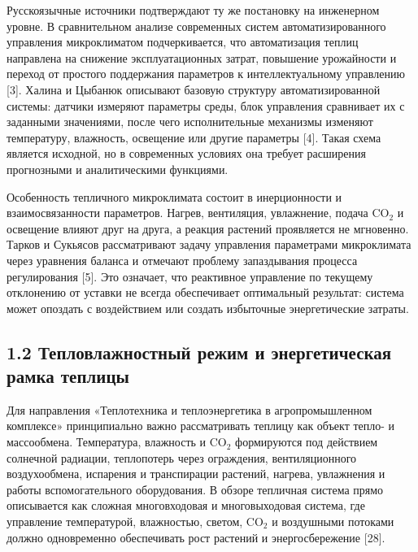 \documentclass[a4paper,14pt]{extarticle}
\begin{document}
Русскоязычные источники подтверждают ту же постановку на инженерном
уровне. В сравнительном анализе современных систем автоматизированного
управления микроклиматом подчеркивается, что автоматизация теплиц
направлена на снижение эксплуатационных затрат, повышение урожайности и
переход от простого поддержания параметров к интеллектуальному
управлению {[}3{]}. Халина и Цыбанюк описывают базовую структуру
автоматизированной системы: датчики измеряют параметры среды, блок
управления сравнивает их с заданными значениями, после чего
исполнительные механизмы изменяют температуру, влажность, освещение или
другие параметры {[}4{]}. Такая схема является исходной, но в
современных условиях она требует расширения прогнозными и аналитическими
функциями.

Особенность тепличного микроклимата состоит в инерционности и
взаимосвязанности параметров. Нагрев, вентиляция, увлажнение, подача
CO\(_2\) и освещение влияют друг на друга, а реакция растений
проявляется не мгновенно. Тарков и Сукьясов рассматривают задачу
управления параметрами микроклимата через уравнения баланса и отмечают
проблему запаздывания процесса регулирования {[}5{]}. Это означает, что
реактивное управление по текущему отклонению от уставки не всегда
обеспечивает оптимальный результат: система может опоздать с
воздействием или создать избыточные энергетические затраты.

\hypertarget{ux442ux435ux43fux43bux43eux432ux43bux430ux436ux43dux43eux441ux442ux43dux44bux439-ux440ux435ux436ux438ux43c-ux438-ux44dux43dux435ux440ux433ux435ux442ux438ux447ux435ux441ux43aux430ux44f-ux440ux430ux43cux43aux430-ux442ux435ux43fux43bux438ux446ux44b}{%
\subsection{1.2 Тепловлажностный режим и энергетическая рамка
теплицы}\label{ux442ux435ux43fux43bux43eux432ux43bux430ux436ux43dux43eux441ux442ux43dux44bux439-ux440ux435ux436ux438ux43c-ux438-ux44dux43dux435ux440ux433ux435ux442ux438ux447ux435ux441ux43aux430ux44f-ux440ux430ux43cux43aux430-ux442ux435ux43fux43bux438ux446ux44b}}

Для направления «Теплотехника и теплоэнергетика в агропромышленном
комплексе» принципиально важно рассматривать теплицу как объект тепло- и
массообмена. Температура, влажность и CO\(_2\) формируются под действием
солнечной радиации, теплопотерь через ограждения, вентиляционного
воздухообмена, испарения и транспирации растений, нагрева, увлажнения и
работы вспомогательного оборудования. В обзоре тепличная система прямо
описывается как сложная многовходовая и многовыходовая система, где
управление температурой, влажностью, светом, CO\(_2\) и воздушными
потоками должно одновременно обеспечивать рост растений и
энергосбережение {[}28{]}.
\end{document}
